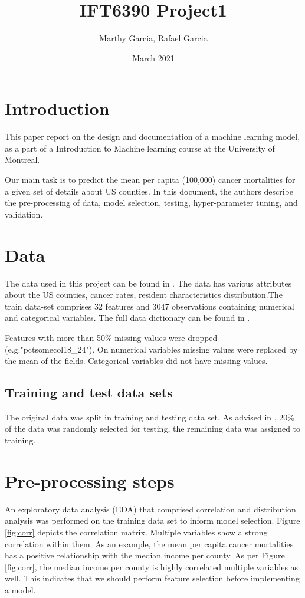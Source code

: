 \documentclass[twocolumn]{article}
\title{IFT6390 Project1}
\author{Marthy Garcia, Rafael Garcia}
\date{March 2021}
\begin{document}
\maketitle

\section{Introduction}
This paper report on the design and documentation of a machine learning model, as a part of a Introduction to Machine learning course at the University of Montreal. 

Our main task is to predict the mean per capita (100,000) cancer mortalities for a given set of details about US counties. In this document, the authors describe the pre-processing of data, model selection, testing, hyper-parameter tuning, and validation.

\section{Data } \label{secData}

The data used in this project can be found in \cite{bibdata}. The data has various attributes about the US counties, cancer rates, resident characteristics distribution.The train data-set comprises 32 features and 3047 observations containing numerical and categorical variables. The full data dictionary can be found in \cite{bibdatadict}.

Features with more than 50\% missing values were dropped (e.g."pctsomecol18\_24"). On numerical variables missing values were replaced by the mean of the fields. Categorical variables did not have missing values.

\subsection{Training and test data sets} \label{secsplit}
The original data was split in training and testing data set. As advised in \cite{bibDangeti2017},  20\% of the data was randomly selected for testing, the remaining data was assigned to training.


\section{Pre-processing steps} \label{secpre}
An exploratory data analysis (EDA) that comprised correlation and distribution analysis was performed on the training data set to inform model selection. Figure \ref{fig:corr} depicts the correlation matrix. Multiple variables show a strong correlation within them. As an example, the mean per capita cancer mortalities has a positive relationship with the median income per county. As per Figure \ref{fig:corr}, the median income per county is highly correlated multiple variables as well. This indicates that we should perform feature selection before implementing a model.
\end{document}
